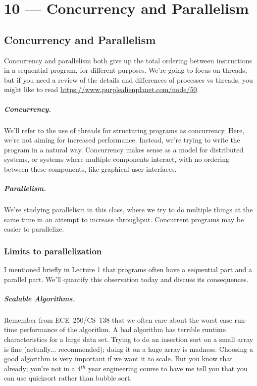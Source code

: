 \documentclass[a4paper]{report}
\begin{document}
\chapter*{10 --- Concurrency and Parallelism}


\section*{Concurrency and Parallelism}
Concurrency and parallelism both give up the
total ordering between instructions in a sequential program, for
different purposes. We're going to focus on threads, but if you need a review of the details and differences of processes vs threads, you might like to read   \url{https://www.purplealienplanet.com/node/50}. 

\paragraph{Concurrency.} We'll refer to the use of threads for
structuring programs as concurrency. Here, we're not aiming
for increased performance. Instead, we're trying to write the program
in a natural way. Concurrency makes sense as a model for distributed
systems, or systems where multiple components interact, with no ordering
between these components, like graphical user interfaces.

\paragraph{Parallelism.} We're studying parallelism in this class, where
we try to do multiple things at the same time in an attempt to increase
throughput. Concurrent programs may be easier to parallelize.

\subsection*{Limits to parallelization}
I mentioned briefly in Lecture 1 that programs often have a sequential
part and a parallel part. We'll quantify this observation today
and discuss its consequences.

\paragraph{Scalable Algorithms.} 
Remember from ECE~250/CS~138 that we often care about the worst case run-time performance of the algorithm. A bad algorithm has terrible runtime characteristics for a large data set. Trying to do an insertion sort on a small array is fine (actually... recommended); doing it on a huge array is madness. Choosing a good algorithm is very important if we want it to scale.  But you know that already; you're not in a 4$^{th}$ year engineering course to have me tell you that you can use quicksort rather than bubble sort.
\end{document}
